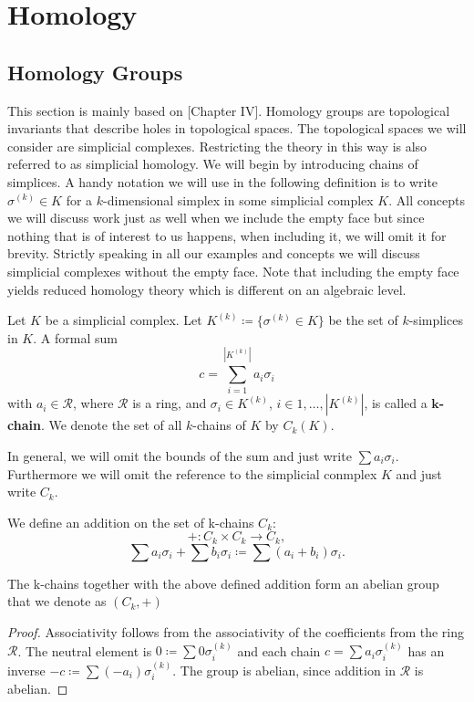 \chapter{Homology}
\label{ch:homology}
\section{Homology Groups}
This section is mainly based on \cite{Computational+Topology}[Chapter IV]. Homology groups are topological invariants that describe holes in topological spaces. The topological spaces we will consider are simplicial complexes. Restricting the theory in this way is also referred to as simplicial homology. We will begin by introducing chains of simplices. A handy notation we will use in the following definition is to write $\sigma^{(k)} \in K$ for a $k$-dimensional simplex in some simplicial complex $K$. All concepts we will discuss work just as well when we include the empty face but since nothing that is of interest to us happens, when including it, we will omit it for brevity. Strictly speaking in all our examples and concepts we will discuss simplicial complexes without the empty face. Note that including the empty face yields reduced homology theory which is different on an algebraic level. 

\begin{defi}
Let $K$ be a simplicial complex. Let $K^{(k)} \coloneqq \{\sigma^{(k)} \in K\}$ be the set of $k$-simplices in $K$. A formal sum \[
c = \sum_{i=1}^{|K^{(k)}|} a_i \sigma_i
\]
with $a_i \in \mathcal{R}$, where $\mathcal{R}$ is a ring, and $\sigma_i \in K^{(k)}$, $i \in 1,\dots,|K^{(k)} |$, is called a \textbf{$\bm{k}$-chain}. We denote the set of all $k$-chains of $K$ by $C_k(K)$.
\end{defi}

In general, we will omit the bounds of the sum and just write $\sum a_i \sigma_i$. Furthermore we will omit the reference to the simplicial conmplex $K$ and just write $C_k$.

\begin{defi}
We define an addition on the set of k-chains $C_k$: \[
+: C_k \times C_k \rightarrow C_k, \]\[
\sum a_i \sigma_i + \sum b_i \sigma_i \coloneqq \sum (a_i+b_i) \sigma_i.
\] 
\label{def:addition_of_kchains}
\end{defi}

\begin{lemma}
The k-chains together with the above defined addition form an abelian group that we denote as $(C_k,+)$
\end{lemma}
\begin{proof}
Associativity follows from the associativity of the coefficients from the ring $\mathcal{R}$. The neutral element is $0 \coloneqq \sum 0\sigma^{(k)}_i$ and each chain $c = \sum a_i\sigma^{(k)}_i$ has an inverse $-c \coloneqq \sum (-a_i)\sigma^{(k)}_i$. The group is abelian, since addition in $\mathcal{R}$ is abelian.
\end{proof}

